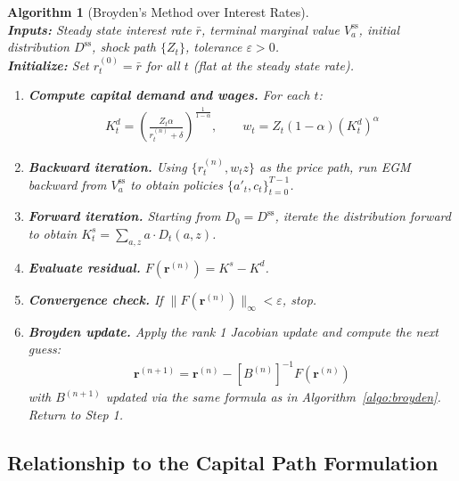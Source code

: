 \documentclass[12pt]{article}
\newtheorem{algorithm_env}{Algorithm}
\begin{document}
\begin{algorithm_env}[Broyden's Method over Interest Rates]
\label{algo:broyden_r}
\mbox{} \\
\textbf{Inputs:} Steady state interest rate $\bar{r}$, terminal marginal value $V_a^{\text{ss}}$, initial distribution $D^{\text{ss}}$, shock path $\{Z_t\}$, tolerance $\varepsilon > 0$. \\[6pt]
\textbf{Initialize:} Set $r^{(0)}_t = \bar{r}$ for all $t$ (flat at the steady state rate).
\begin{enumerate}[label=\textbf{Step \arabic*.}, leftmargin=2.5cm]
    \item \textbf{Compute capital demand and wages.} For each $t$:
    \begin{align*}
        K^d_t = \left(\frac{Z_t \alpha}{r^{(n)}_t + \delta}\right)^{\!\frac{1}{1-\alpha}}, \qquad w_t = Z_t(1-\alpha)(K^d_t)^\alpha
    \end{align*}

    \item \textbf{Backward iteration.} Using $\{r^{(n)}_t, w_t z\}$ as the price path, run EGM backward from $V_a^{\text{ss}}$ to obtain policies $\{a'_t, c_t\}_{t=0}^{T-1}$.

    \item \textbf{Forward iteration.} Starting from $D_0 = D^{\text{ss}}$, iterate the distribution forward to obtain $K^s_t = \sum_{a,z} a \cdot D_t(a,z)$.

    \item \textbf{Evaluate residual.} $F(\mathbf{r}^{(n)}) = K^s - K^d$.

    \item \textbf{Convergence check.} If $\|F(\mathbf{r}^{(n)})\|_\infty < \varepsilon$, stop.

    \item \textbf{Broyden update.} Apply the rank 1 Jacobian update and compute the next guess:
    \begin{align*}
        \mathbf{r}^{(n+1)} = \mathbf{r}^{(n)} - \left[B^{(n)}\right]^{-1} F(\mathbf{r}^{(n)})
    \end{align*}
    with $B^{(n+1)}$ updated via the same formula as in Algorithm~\ref{algo:broyden}. Return to Step 1.
\end{enumerate}
\end{algorithm_env}

\subsection{Relationship to the Capital Path Formulation}
\end{document}
